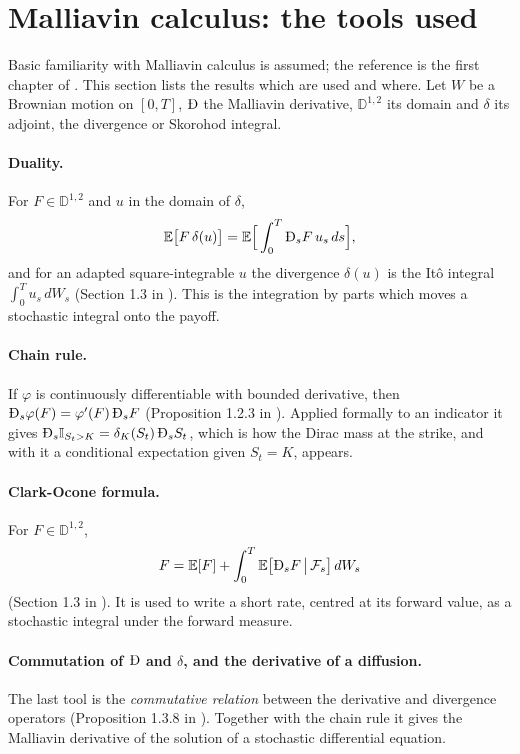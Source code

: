 \section{Malliavin calculus: the tools used}\label{sec: tools}
Basic familiarity with Malliavin calculus is assumed; the reference is the first chapter of \cite{nualart}. This section lists the results which are used and where. Let $W$ be a Brownian motion on $[0,T]$, $\MD$ the Malliavin derivative, $\mathbb{D}^{1,2}$ its domain and $\delta$ its adjoint, the divergence or Skorohod integral.

\paragraph{Duality.} For $F\in\mathbb{D}^{1,2}$ and $u$ in the domain of $\delta$,
\begin{equation}\label{eq: duality}
\mathbb{E}\big[F\,\delta(u)\big]=\mathbb{E}\Big[\int_0^T \MD_sF\,u_s\,ds\Big],
\end{equation}
and for an adapted square-integrable $u$ the divergence $\delta(u)$ is the It\^o integral $\int_0^Tu_s\,dW_s$ (Section 1.3 in \cite{nualart}). This is the integration by parts which moves a stochastic integral onto the payoff.

\paragraph{Chain rule.} If $\varphi$ is continuously differentiable with bounded derivative, then $\MD_s\varphi(F)=\varphi'(F)\,\MD_sF$ (Proposition 1.2.3 in \cite{nualart}). Applied formally to an indicator it gives $\MD_s\mathbb{I}_{S_t>K}=\delta_K(S_t)\,\MD_sS_t$, which is how the Dirac mass at the strike, and with it a conditional expectation given $S_t=K$, appears.

\paragraph{Clark-Ocone formula.} For $F\in\mathbb{D}^{1,2}$,
\begin{equation}\label{eq: clarkOcone}
F=\mathbb{E}[F]+\int_0^T\mathbb{E}\big[\MD_sF\,\big|\,\mathcal{F}_s\big]\,dW_s
\end{equation}
(Section 1.3 in \cite{nualart}). It is used to write a short rate, centred at its forward value, as a stochastic integral under the forward measure.

\paragraph{Commutation of $\MD$ and $\delta$, and the derivative of a diffusion.} The last tool is the \textit{commutative relation} between the derivative and divergence operators (Proposition 1.3.8 in \cite{nualart}). Together with the chain rule it gives the Malliavin derivative of the solution of a stochastic differential equation.

